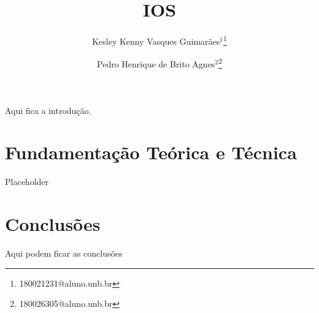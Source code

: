 \documentclass{vgtc}                          %
\title{IOS}
\author{Kesley Kenny Vasques Guimarães$^{1}$\thanks{180021231@aluno.unb.br}
\and Pedro Henrique de Brito Agnes$^{2}$\thanks{180026305@aluno.unb.br}}
\affiliation{\scriptsize $^{1}$Universidade de Brasília, Departmento de Ciência da Computação, Brasil}
\begin{document}
\begin{large}



\maketitle


Aqui fica a introdução.

\section{Fundamentação Teórica e Técnica}

Placeholder

\section{Conclusões}

Aqui podem ficar as conclusões



\end{large}
\end{document}
